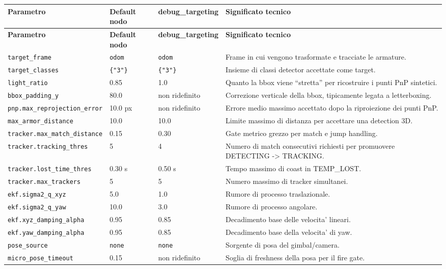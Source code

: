 \documentclass[11pt,a4paper]{article}
\newcommand{\code}[1]{\texttt{#1}}
\begin{document}
\begin{longtable}{p{} p{} p{} p{}}
\toprule
\textbf{Parametro} & \textbf{Default nodo} & \textbf{debug\_targeting} & \textbf{Significato tecnico} \\
\midrule
\endfirsthead
\toprule
\textbf{Parametro} & \textbf{Default nodo} & \textbf{debug\_targeting} & \textbf{Significato tecnico} \\
\midrule
\endhead
\code{target\_frame} & \code{odom} & \code{odom} & Frame in cui vengono trasformate e tracciate le armature. \\
\code{target\_classes} & \code{\{"3"\}} & \code{\{"3"\}} & Insieme di classi detector accettate come target. \\
\code{light\_ratio} & 0.85 & 1.0 & Quanto la bbox viene ``stretta'' per ricostruire i punti PnP sintetici. \\
\code{bbox\_padding\_y} & 80.0 & non ridefinito & Correzione verticale della bbox, tipicamente legata a letterboxing. \\
\code{pnp.max\_reprojection\_error} & 10.0 px & non ridefinito & Errore medio massimo accettato dopo la riproiezione dei punti PnP. \\
\code{max\_armor\_distance} & 10.0 & 10.0 & Limite massimo di distanza per accettare una detection 3D. \\
\code{tracker.max\_match\_distance} & 0.15 & 0.30 & Gate metrico grezzo per match e jump handling. \\
\code{tracker.tracking\_thres} & 5 & 4 & Numero di match consecutivi richiesti per promuovere DETECTING -> TRACKING. \\
\code{tracker.lost\_time\_thres} & 0.30 s & 0.50 s & Tempo massimo di coast in TEMP\_LOST. \\
\code{tracker.max\_trackers} & 5 & 5 & Numero massimo di tracker simultanei. \\
\code{ekf.sigma2\_q\_xyz} & 5.0 & 1.0 & Rumore di processo traslazionale. \\
\code{ekf.sigma2\_q\_yaw} & 10.0 & 3.0 & Rumore di processo angolare. \\
\code{ekf.xyz\_damping\_alpha} & 0.95 & 0.85 & Decadimento base delle velocita' lineari. \\
\code{ekf.yaw\_damping\_alpha} & 0.95 & 0.85 & Decadimento base della velocita' di yaw. \\
\code{pose\_source} & \code{none} & \code{none} & Sorgente di posa del gimbal/camera. \\
\code{micro\_pose\_timeout} & 0.15 & non ridefinito & Soglia di freshness della posa per il fire gate. \\

\end{longtable}
\end{document}
